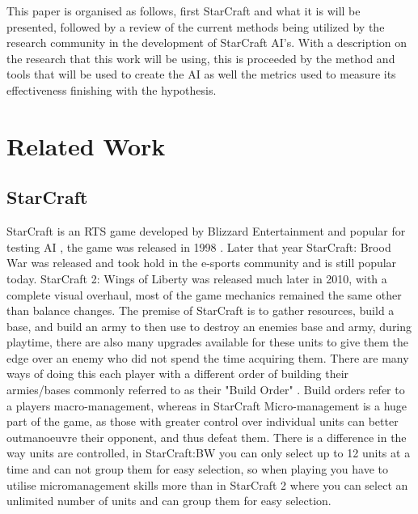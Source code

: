 \documentclass[journal]{IEEEtran}
\begin{document}
This paper is organised as follows, first StarCraft and what it is will be presented, followed by a review of the current methods being utilized by the research community in the development of StarCraft AI's. With a description on the research that this work will be using, this is proceeded by the method and tools that will be used to create the AI as well the metrics used to measure its effectiveness finishing with the hypothesis.

\section{Related Work}
\subsection{StarCraft}
StarCraft is an RTS game developed by Blizzard Entertainment \cite{Blizzard} and popular for testing AI \cite{Current}, the game was released in 1998 \cite{Release}. Later that year StarCraft: Brood War was released and took hold in the e-sports community and is still popular today. StarCraft 2: Wings of Liberty was released much later in 2010, with a complete visual overhaul, most of the game mechanics remained the same other than balance changes. The premise of StarCraft is to gather resources, build a base, and build an army to then use to destroy an enemies base and army, during playtime, there are also many upgrades available for these units to give them the edge over an enemy who did not spend the time acquiring them. There are many ways of doing this each player with a different order of building their armies/bases commonly referred to as their "Build Order" \cite{BuildOrder}. Build orders refer to a players macro-management, whereas in StarCraft Micro-management is a huge part of the game, as those with greater control over individual units can better outmanoeuvre their opponent, and thus defeat them. There is a difference in the way units are controlled, in StarCraft:BW you can only select up to 12 units at a time and can not group them for easy selection, so when playing you have to utilise micromanagement skills more than in StarCraft 2 where you can select an unlimited number of units and can group them for easy selection.
\end{document}
